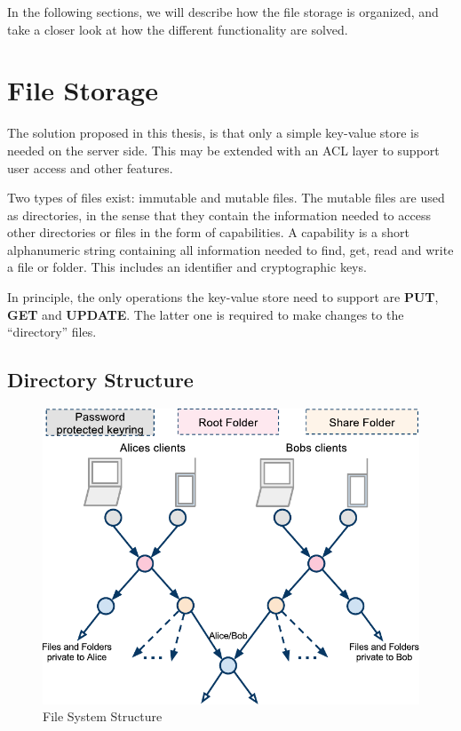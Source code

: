 \documentclass[pdftex,english,10pt,b5paper,twoside]{book}
\begin{document}
In the following sections, we will describe how the file storage is organized,
and take a closer look at how the different functionality are solved.

\section{File Storage}
\label{sec:AS:FS}

The solution proposed in this thesis, is that only a simple key-value store is
needed on the server side. This may be extended with an \ac{ACL} layer to
support user access and other features.

Two types of files exist: immutable and mutable files. The mutable files are used
as directories, in the sense that they contain the information needed to access
other directories or files in the form of capabilities.
A capability is a short alphanumeric string containing all information needed
to find, get, read and write a file or folder. This includes an identifier and
cryptographic keys.

In principle, the only operations the key-value store need to support are
\textbf{PUT}, \textbf{GET} and \textbf{UPDATE}. The latter one is required to
make changes to the ``directory'' files.

\subsection{Directory Structure}

\begin{figure}[h!]
    \centering
    \includegraphics[width=\columnwidth]{ArchitectureFileSystem.pdf}
    \caption{File System Structure}
    \label{fig:AS:filesystem}
\end{figure}
\end{document}
